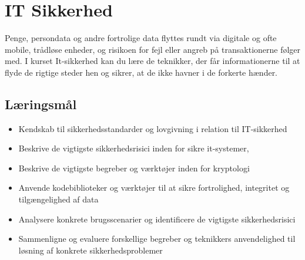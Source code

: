 \section*{IT Sikkerhed}
Penge, persondata og andre fortrolige data flyttes rundt via digitale og ofte mobile, trådløse enheder, og risikoen for fejl eller angreb på transaktionerne følger med. I kurset It-sikkerhed kan du lære de teknikker, der får informationerne til at flyde de rigtige steder hen og sikrer, at de ikke havner i de forkerte hænder.

\subsection*{Læringsmål}
\begin{itemize}
	\item Kendskab til sikkerhedsstandarder og lovgivning i relation til IT-sikkerhed
	\item Beskrive de vigtigste sikkerhedsrisici inden for sikre it-systemer,
	\item Beskrive de vigtigste begreber og værktøjer inden for kryptologi
	\item Anvende kodebiblioteker og værktøjer til at sikre fortrolighed, integritet og tilgængelighed af data
	\item Analysere konkrete brugsscenarier og identificere de vigtigste sikkerhedsrisici
	\item Sammenligne og evaluere forskellige begreber og teknikkers anvendelighed til løsning af konkrete sikkerhedsproblemer
\end{itemize}